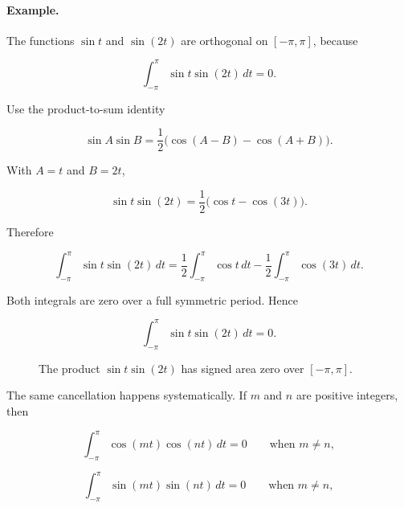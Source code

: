 \paragraph{Example.}
The functions \(\sin t\) and \(\sin(2t)\) are orthogonal on \([-\pi,\pi]\), because

\[
\int_{-\pi}^{\pi} \sin t\sin(2t)\,dt=0.
\]

Use the product-to-sum identity

\[
\sin A\sin B
=
\frac12\bigl(\cos(A-B)-\cos(A+B)\bigr).
\]

With \(A=t\) and \(B=2t\),

\[
\sin t\sin(2t)
=
\frac12\bigl(\cos t-\cos(3t)\bigr).
\]

Therefore

\[
\int_{-\pi}^{\pi}\sin t\sin(2t)\,dt
=
\frac12\int_{-\pi}^{\pi}\cos t\,dt
-
\frac12\int_{-\pi}^{\pi}\cos(3t)\,dt.
\]

Both integrals are zero over a full symmetric period.  Hence

\[
\boxed{
\int_{-\pi}^{\pi}\sin t\sin(2t)\,dt=0.
}
\]

\begin{figure}[h]
\centering
{}
\caption{The product \(\sin t\sin(2t)\) has signed area zero over \([-\pi,\pi]\).}
\label{fig:orthogonality-product-signed-area}
\end{figure}

The same cancellation happens systematically.  If \(m\) and \(n\) are positive integers,
then

\[
\int_{-\pi}^{\pi}\cos(mt)\cos(nt)\,dt=0
\qquad\text{when }m\neq n,
\]

\[
\int_{-\pi}^{\pi}\sin(mt)\sin(nt)\,dt=0
\qquad\text{when }m\neq n,
\]

